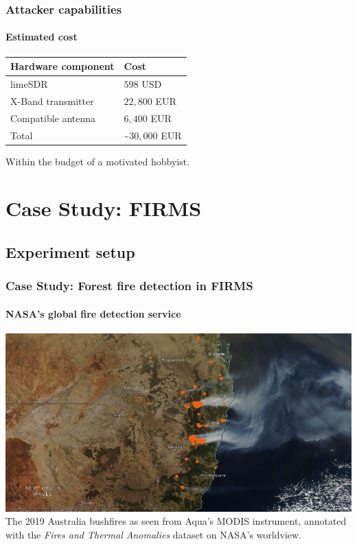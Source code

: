 \documentclass{beamer}
\begin{document}
\begin{frame}
  \frametitle{Attacker capabilities}
  \framesubtitle{Estimated cost}
  \centering
  \begin{tabular}{ l | l }
    \textbf{Hardware component} & \textbf{Cost} \\
    \hline
    limeSDR & $598$ USD \\
    X-Band transmitter & $22,800$ EUR \\
    Compatible antenna & $6,400$ EUR \\
    \hline
    Total & \~{}$30,000$ EUR
  \end{tabular}

  Within the budget of a motivated hobbyist.
\end{frame}

\section{Case Study: FIRMS}
\subsection{Experiment setup}

\begin{frame}
  \frametitle{Case Study: Forest fire detection in FIRMS}
  \framesubtitle{NASA's global fire detection service}
  \centering
  \includegraphics[width=\columnwidth]{images/bushfire.png}
  \newline
  The 2019 Australia bushfires as seen from Aqua's MODIS instrument, annotated with the \textit{Fires and Thermal Anomalies} dataset on NASA's worldview.
\end{frame}
\end{document}
